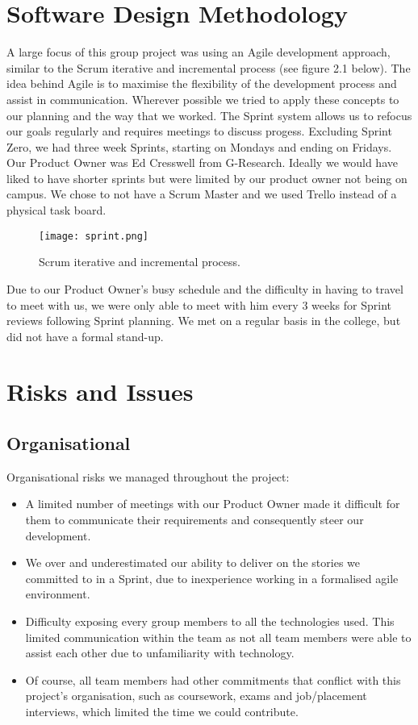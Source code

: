 \section{Software Design Methodology}
A large focus of this group project was using an Agile development approach, similar to the Scrum iterative and incremental process (see figure 2.1 below). The idea behind Agile is to maximise the flexibility of the development process and assist in communication. Wherever possible we tried to apply these concepts to our planning and the way that we worked. The Sprint system allows us to refocus our goals regularly and requires meetings to discuss progess. Excluding Sprint Zero, we had three week Sprints, starting on Mondays and ending on Fridays. Our Product Owner was Ed Cresswell from G-Research.  Ideally we would have liked to have shorter sprints but were limited by our product owner not being on campus. We chose to not have a Scrum Master and we used Trello instead of a physical task board.

\begin{figure}[H]
\centering
\texttt{[image: sprint.png]}
\caption{Scrum iterative and incremental process.}
\label{fig:scrum}
\end{figure}

Due to our Product Owner's busy schedule and the difficulty in having to travel to meet with us, we were only able to meet with him every 3 weeks for Sprint reviews following Sprint planning. We met on a regular basis in the college, but did not have a formal stand-up.

\section{Risks and Issues}
\subsection{Organisational}
Organisational risks we managed throughout the project:
\begin{itemize}
\item A limited number of meetings with our Product Owner made it difficult for them to communicate their requirements and consequently steer our development.
\item We over and underestimated our ability to deliver on the stories we committed to in a Sprint, due to inexperience working in a formalised agile environment.
\item Difficulty exposing every group members to all the technologies used. This limited communication within the team as not all team members were able to assist each other due to unfamiliarity with technology.
\item Of course, all team members had other commitments that conflict with this project's organisation, such as coursework, exams and job/placement interviews, which limited the time we could contribute.
\end{itemize}

